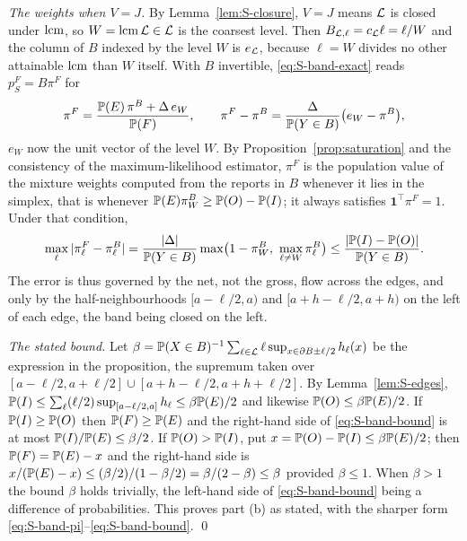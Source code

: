 \emph{The weights when $V=J$.} By Lemma~\ref{lem:S-closure}, $V=J$ means $\mathcal{L}$ is closed under $\operatorname{lcm}$, so $W=\operatorname{lcm}\mathcal{L}\in\mathcal{L}$ is the coarsest level. Then $B_{\mathcal{L},\ell}=c_{\mathcal{L}}\ell=\ell/W$ and the column of $B$ indexed by the level $W$ is $e_{\mathcal{L}}$, because $\ell=W$ divides no other attainable $\operatorname{lcm}$ than $W$ itself. With $B$ invertible, \eqref{eq:S-band-exact} reads $p^F_S=B\pi^F$ for
\begin{equation}\label{eq:S-band-pi}
\pi^F=\frac{\mathbb{P}(E)\,\pi^B+\Delta\,e_W}{\mathbb{P}(F)},\qquad
\pi^F-\pi^B=\frac{\Delta}{\mathbb{P}(Y\in B)}\bigl(e_W-\pi^B\bigr),
\end{equation}
$e_W$ now the unit vector of the level $W$. By Proposition~\ref{prop:saturation} and the consistency of the maximum-likelihood estimator, $\pi^F$ is the population value of the mixture weights computed from the reports in $B$ whenever it lies in the simplex, that is whenever $\mathbb{P}(E)\pi^B_W\ge\mathbb{P}(O)-\mathbb{P}(I)$; it always satisfies $\mathbf 1^\top\pi^F=1$. Under that condition,
\begin{equation}\label{eq:S-band-bound}
\max_\ell|\pi^F_\ell-\pi^B_\ell|=\frac{|\Delta|}{\mathbb{P}(Y\in B)}\max\bigl(1-\pi^B_W,\ \max_{\ell\ne W}\pi^B_\ell\bigr)\le\frac{|\mathbb{P}(I)-\mathbb{P}(O)|}{\mathbb{P}(Y\in B)} .
\end{equation}
The error is thus governed by the net, not the gross, flow across the edges, and only by the half-neighbourhoods $[a-\ell/2,a)$ and $[a+h-\ell/2,a+h)$ on the left of each edge, the band being closed on the left.

\emph{The stated bound.} Let $\beta=\mathbb{P}(X\in B)^{-1}\sum_{\ell\in\mathcal{L}}\ell\sup_{x\in\partial B\pm\ell/2}h_\ell(x)$ be the expression in the proposition, the supremum taken over $[a-\ell/2,a+\ell/2]\cup[a+h-\ell/2,a+h+\ell/2]$. By Lemma~\ref{lem:S-edges}, $\mathbb{P}(I)\le\sum_\ell(\ell/2)\sup_{[a-\ell/2,a]}h_\ell\le\beta\mathbb{P}(E)/2$ and likewise $\mathbb{P}(O)\le\beta\mathbb{P}(E)/2$. If $\mathbb{P}(I)\ge\mathbb{P}(O)$ then $\mathbb{P}(F)\ge\mathbb{P}(E)$ and the right-hand side of \eqref{eq:S-band-bound} is at most $\mathbb{P}(I)/\mathbb{P}(E)\le\beta/2$. If $\mathbb{P}(O)>\mathbb{P}(I)$, put $x=\mathbb{P}(O)-\mathbb{P}(I)\le\beta\mathbb{P}(E)/2$; then $\mathbb{P}(F)=\mathbb{P}(E)-x$ and the right-hand side is $x/(\mathbb{P}(E)-x)\le(\beta/2)/(1-\beta/2)=\beta/(2-\beta)\le\beta$ provided $\beta\le1$. When $\beta>1$ the bound $\beta$ holds trivially, the left-hand side of \eqref{eq:S-band-bound} being a difference of probabilities. This proves part (b) as stated, with the sharper form \eqref{eq:S-band-pi}--\eqref{eq:S-band-bound}. \qed

